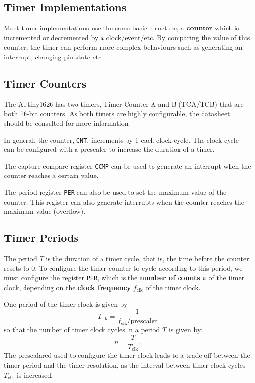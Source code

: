 \documentclass{report}
\begin{document}
\subsection{Timer Implementations}
Most timer implementations use the same basic structure,
a \textbf{counter} which is incremented or decremented by a clock/event/etc.
By comparing the value of this counter, the timer can perform
more complex behaviours such as generating an interrupt, changing pin state etc.
\subsection{Timer Counters}
The ATtiny1626 has two timers, Timer Counter A and B (TCA/TCB)
that are both 16-bit counters. As both timers are highly configurable,
the datasheet should be consulted for more information.

In general, the counter, \texttt{CNT}, increments
by 1 each clock cycle. The clock cycle can be configured with a prescaler
to increase the duration of a timer.

The capture compare register \texttt{CCMP} can be used to
generate an interrupt when the counter reaches a certain value.

The period register \texttt{PER} can also be used to
set the maximum value of the counter. This register can also generate
interrupts when the counter reaches the maximum value (overflow).
\subsection{Timer Periods}
The period \(T\) is the duration of a timer cycle, that is, the time before the counter
resets to 0. To configure the timer counter to cycle according to this period, we must
configure the register \texttt{PER}, which is the \textbf{number of counts} \(n\) of the
timer clock, depending on the \textbf{clock frequency} \(f_\mathrm{clk}\) of the timer clock.

One period of the timer clock is given by:
\begin{equation*}
    T_\mathrm{clk} = \frac{1}{f_\mathrm{clk} / \mathrm{prescaler}}
\end{equation*}
so that the number of timer clock cycles in a period \(T\) is given by:
\begin{equation*}
    n = \frac{T}{T_\mathrm{clk}}.
\end{equation*}
The prescalared used to configure the timer clock leads to a trade-off between
the timer period and the timer resolution, as the interval between timer clock cycles \(T_\mathrm{clk}\)
is increased.
\end{document}
